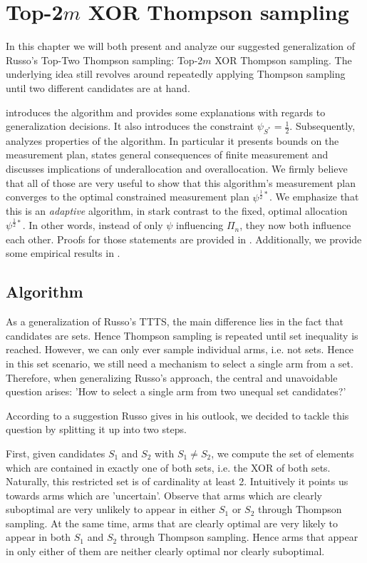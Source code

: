\chapter{Top-2$m$ XOR Thompson sampling}\label{chapter:algorithm}

In this chapter we will both present and analyze our suggested generalization of
Russo's Top-Two Thompson sampling: Top-2$m$ XOR Thompson sampling. The
underlying idea still revolves around repeatedly applying Thompson sampling
until two different candidates are at hand.

 introduces the algorithm and provides some explanations
with regards to generalization decisions. It also introduces the constraint
$\psi_{S^*} = \frac{1}{2}$. Subsequently,  analyzes
properties of the algorithm. In particular it presents bounds on the measurement
plan, states general consequences of finite measurement and discusses
implications of underallocation and overallocation. We firmly believe that all
of those are very useful to show that this algorithm's measurement plan
converges to the optimal constrained measurement plan $\psi^{\frac{1}{2}*}$. We
emphasize that this is an \emph{adaptive} algorithm, in stark contrast to the
fixed, optimal allocation $\psi^{\frac{1}{2}*}$. In other words, instead of only
$\psi$ influencing $\Pi_n$, they now both influence each other. Proofs for those
statements are provided in . Additionally, we provide
some empirical results in .

\section{Algorithm}\label{section:algorithm}
As a generalization of Russo's TTTS, the main difference lies in the fact that
candidates are sets. Hence Thompson sampling is repeated until set inequality is
reached. However, we can only ever sample individual arms, i.e. not sets. Hence
in this set scenario, we still need a mechanism to select a single arm from a
set. Therefore, when generalizing Russo's approach, the central and unavoidable
question arises: 'How to select a single arm from two unequal set candidates?'

According to a suggestion Russo gives in his outlook, we decided to tackle this
question by splitting it up into two steps.

First, given candidates $S_1$ and $S_2$ with $S_1 \neq S_2$, we compute the set
of elements which are contained in exactly one of both sets, i.e. the XOR of
both sets. Naturally, this restricted set is of cardinality at least 2.
Intuitively it points us towards arms which are 'uncertain'. Observe that arms
which are clearly suboptimal are very unlikely to appear in either $S_1$ or
$S_2$ through Thompson sampling. At the same time, arms that are clearly optimal
are very likely to appear in both $S_1$ and $S_2$ through Thompson sampling.
Hence arms that appear in only either of them are neither clearly optimal nor
clearly suboptimal.

